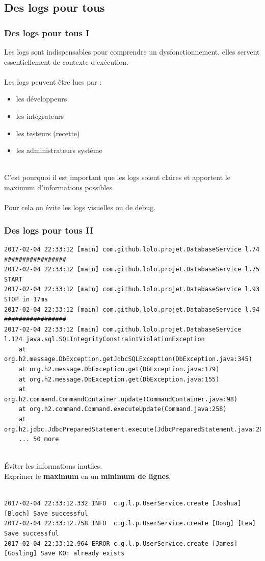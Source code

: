 \subsection{Des logs pour tous}
\begin{frame}
	\frametitle{Des logs pour tous I}

    Les logs sont indispensables pour comprendre un dysfonctionnement, elles servent essentiellement de contexte d'ex\'{e}cution.
    \\~\\
    Les logs peuvent \^{e}tre lues par :
    \begin{itemize}
    	\item les d\'{e}veloppeurs
        \item les int\'{e}grateurs
        \item les testeurs (recette)
        \item les administrateurs syst\`{e}me
    \end{itemize}
    ~\\
    C'est pourquoi il est important que les logs soient claires et apportent le maximum d'informations possibles.
    \\~\\
    Pour cela on \'{e}vite les logs visuelles ou de debug.
\end{frame}

\begin{frame}[fragile]
	\frametitle{Des logs pour tous II}

    \begin{lstlisting}[basicstyle=\tiny]
2017-02-04 22:33:12 [main] com.github.lolo.projet.DatabaseService l.74 #################
2017-02-04 22:33:12 [main] com.github.lolo.projet.DatabaseService l.75 START
2017-02-04 22:33:12 [main] com.github.lolo.projet.DatabaseService l.93 STOP in 17ms
2017-02-04 22:33:12 [main] com.github.lolo.projet.DatabaseService l.94 #################
2017-02-04 22:33:12 [main] com.github.lolo.projet.DatabaseService l.124 java.sql.SQLIntegrityConstraintViolationException
	at org.h2.message.DbException.getJdbcSQLException(DbException.java:345)
	at org.h2.message.DbException.get(DbException.java:179)
	at org.h2.message.DbException.get(DbException.java:155)
	at org.h2.command.CommandContainer.update(CommandContainer.java:98)
	at org.h2.command.Command.executeUpdate(Command.java:258)
	at org.h2.jdbc.JdbcPreparedStatement.execute(JdbcPreparedStatement.java:201)
	... 50 more
    \end{lstlisting}
    ~\\
    \'{E}viter les informations inutiles.\\
    Exprimer le \textbf{maximum} en un \textbf{minimum de lignes}.
    \\~\\
    \begin{lstlisting}[basicstyle=\tiny]
2017-02-04 22:33:12.332 INFO  c.g.l.p.UserService.create [Joshua] [Bloch] Save successful
2017-02-04 22:33:12.758 INFO  c.g.l.p.UserService.create [Doug] [Lea] Save successful
2017-02-04 22:33:12.964 ERROR c.g.l.p.UserService.create [James] [Gosling] Save KO: already exists
    \end{lstlisting}
\end{frame}

